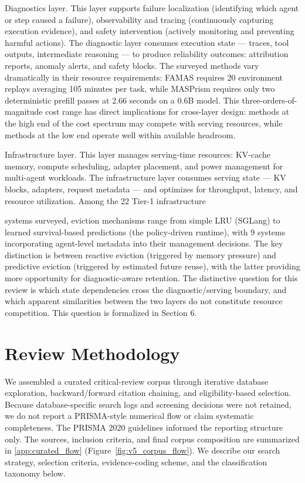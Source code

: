 \documentclass[preprint,12pt]{elsarticle}
\begin{document}
Diagnostics layer. This layer supports failure localization (identifying which agent or step caused a failure), observability and tracing (continuously capturing execution evidence), and safety intervention (actively monitoring and preventing harmful actions). The diagnostic layer consumes execution state --- traces, tool outputs, intermediate reasoning --- to produce reliability outcomes: attribution reports, anomaly alerts, and safety blocks. The surveyed methods vary dramatically in their resource requirements: FAMAS requires 20 environment replays averaging 105 minutes per task, while MASPrism requires only two deterministic prefill passes at 2.66 seconds on a 0.6B model. This three-orders-of-magnitude cost range has direct implications for cross-layer design: methods at the high end of the cost spectrum may compete with serving resources, while methods at the low end operate well within available headroom.


Infrastructure layer. This layer manages serving-time resources: KV-cache memory, compute scheduling, adapter placement, and power management for multi-agent workloads. The infrastructure layer consumes serving state --- KV blocks, adapters, request metadata --- and optimizes for throughput, latency, and resource utilization. Among the 22 Tier-1 infrastructure


systems surveyed, eviction mechanisms range from simple LRU (SGLang) to learned survival-based predictions (the policy-driven runtime), with 9 systems incorporating agent-level metadata into their management decisions. The key distinction is between reactive eviction (triggered by memory pressure) and predictive eviction (triggered by estimated future reuse), with the latter providing more opportunity for diagnostic-aware retention. The distinctive question for this review is which state dependencies cross the diagnostic/serving boundary, and which apparent similarities between the two layers do not constitute resource competition. This question is formalized in Section 6.


\section{Review Methodology}\label{sec:method}
We assembled a curated critical-review corpus through iterative database exploration, backward/forward citation chaining, and eligibility-based selection. Because database-specific search logs and screening decisions were not retained, we do not report a PRISMA-style numerical flow or claim systematic completeness. The PRISMA 2020 guidelines \cite{v5ref26} informed the reporting structure only. The sources, inclusion criteria, and final corpus composition are summarized in \ref{app:curated_flow} (Figure~\ref{fig:v5_corpus_flow}). We describe our search strategy, selection criteria, evidence-coding scheme, and the classification taxonomy below.
\end{document}
